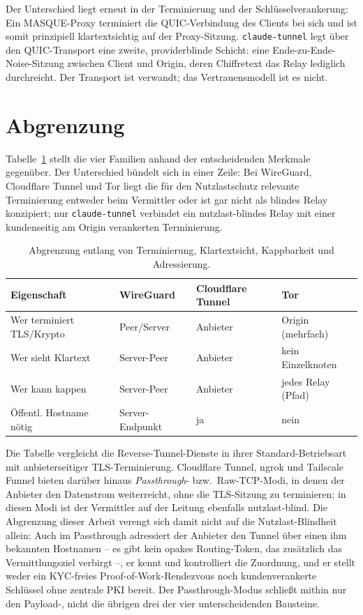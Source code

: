 Der Unterschied liegt erneut in der Terminierung und der Schlüsselverankerung:
Ein MASQUE-Proxy terminiert die QUIC-Verbindung des Clients bei sich und ist
somit prinzipiell klartextsichtig auf der Proxy-Sitzung. \texttt{claude-tunnel}
legt über den QUIC-Transport eine zweite, providerblinde Schicht: eine
Ende-zu-Ende-Noise-Sitzung zwischen Client und Origin, deren Chiffretext das
Relay lediglich durchreicht. Der Transport ist verwandt; das Vertrauensmodell ist
es nicht.

\section{Abgrenzung}
\label{sec:rw-abgrenzung}

Tabelle~\ref{tab:rw-abgrenzung} stellt die vier Familien anhand der
entscheidenden Merkmale gegenüber. Der Unterschied bündelt sich in einer Zeile:
Bei WireGuard, Cloudflare Tunnel und Tor liegt die für den Nutzlastschutz
relevante Terminierung entweder beim Vermittler oder ist gar nicht als blindes
Relay konzipiert; nur \texttt{claude-tunnel} verbindet ein nutzlast-blindes Relay
mit einer kundenseitig am Origin verankerten Terminierung.

\begin{table}[t]
\centering
\caption{Abgrenzung entlang von Terminierung, Klartextsicht, Kappbarkeit und
Adressierung.}
\label{tab:rw-abgrenzung}
\begin{tabular}{llll}
\toprule
Eigenschaft & WireGuard & Cloudflare Tunnel & Tor \\
\midrule
Wer terminiert TLS/Krypto & Peer/Server & Anbieter & Origin (mehrfach) \\
Wer sieht Klartext & Server-Peer & Anbieter & kein Einzelknoten \\
Wer kann kappen & Server-Peer & Anbieter & jedes Relay (Pfad) \\
Öffentl. Hostname nötig & Server-Endpunkt & ja & nein \\
\bottomrule
\end{tabular}
\end{table}

Die Tabelle vergleicht die Reverse-Tunnel-Dienste in ihrer Standard-Betriebsart mit
anbieterseitiger TLS-Terminierung. Cloudflare Tunnel, ngrok und Tailscale Funnel
bieten darüber hinaus \emph{Passthrough}- bzw.\ Raw-TCP-Modi, in denen der Anbieter
den Datenstrom weiterreicht, ohne die TLS-Sitzung zu terminieren; in diesen Modi ist
der Vermittler auf der Leitung ebenfalls nutzlast-blind. Die Abgrenzung dieser Arbeit
verengt sich damit nicht auf die Nutzlast-Blindheit allein: Auch im Passthrough
adressiert der Anbieter den Tunnel über einen ihm bekannten Hostnamen -- es gibt kein
opakes Routing-Token, das zusätzlich das Vermittlungsziel verbirgt --, er kennt und
kontrolliert die Zuordnung, und er stellt weder ein KYC-freies
Proof-of-Work-Rendezvous noch kundenverankerte Schlüssel ohne zentrale PKI bereit. Der
Passthrough-Modus schließt mithin nur den Payload-, nicht die übrigen drei der vier
unterscheidenden Bausteine.

